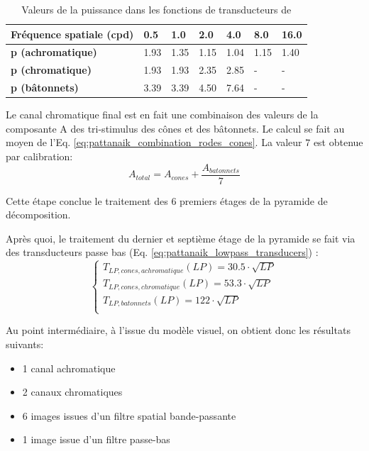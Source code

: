 	\begin{table}
		\centering
		\label{tab:pattanaik_transducers_p_values}
		\small
		\begin{tabular}{|l|l|l|l|l|l|l|}
			\hline
			\textbf{Fréquence spatiale (cpd)} & \textbf{0.5} & \textbf{1.0} & \textbf{2.0} & \textbf{4.0} & \textbf{8.0} & \textbf{16.0}\\
			\hline
			\hline	
			\textbf{p (achromatique)} & 1.93 & 1.35 & 1.15 & 1.04 & 1.15 & 1.40\\
			\hline
			\textbf{p (chromatique)} & 1.93 & 1.93 & 2.35 & 2.85 & - & -\\
			\hline
			\textbf{p (bâtonnets)} & 3.39 & 3.39 & 4.50 & 7.64 & - & -\\
			\hline
		\end{tabular}
		\caption{Valeurs de la puissance dans les fonctions de transducteurs de \citep{watson_model_1997}}
	\end{table}
	
	\par Le canal chromatique final est en fait une combinaison des valeurs de la composante A des tri-stimulus des cônes et des bâtonnets. Le calcul se fait au moyen de l'Eq. \ref{eq:pattanaik_combination_rodes_cones}. La valeur $7$ est obtenue par calibration:
	\begin{equation}
		A_{total} = A_{cones} + \frac{A_{batonnets}}{7}
		\label{eq:pattanaik_combination_rodes_cones}
	\end{equation}
	
	\par Cette étape conclue le traitement des 6 premiers étages de la pyramide de décomposition.
	
	\par Après quoi, le traitement du dernier et septième étage de la pyramide se fait via des transducteurs passe bas (Eq. \ref{eq:pattanaik_lowpass_transducers}) \citep{fairchild_color_1998}:
	\begin{equation}
		\begin{cases}
			T_{LP,cones,achromatique}(LP) = 30.5 \cdot \sqrt{LP}\\
			T_{LP,cones,chromatique}(LP) = 53.3 \cdot \sqrt{LP}\\
			T_{LP,batonnets}(LP) = 122 \cdot \sqrt{LP}\\
		\end{cases}
		\label{eq:pattanaik_lowpass_transducers}
	\end{equation}
	
	\par Au point intermédiaire, à l'issue du modèle visuel, on obtient donc les résultats suivants:
	\begin{itemize}
		\item 1 canal achromatique
		\item 2 canaux chromatiques
		\item 6 images issues d'un filtre spatial bande-passante
		\item 1 image issue d'un filtre passe-bas
	\end{itemize}
	
